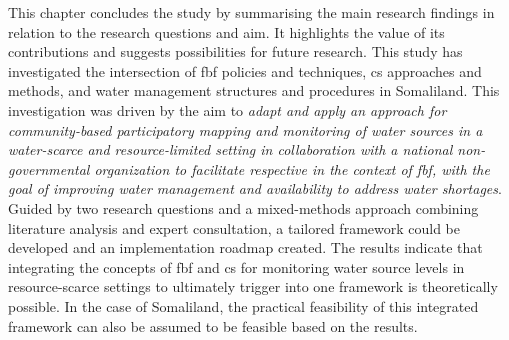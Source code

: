 This chapter concludes the study by summarising the main research findings in relation to the research questions and aim. It highlights the value of its contributions and suggests possibilities for future research.\newline
This study has investigated the intersection of \acrlong{fbf} policies and techniques, \acrlong{cs} approaches and methods, and water management structures and procedures in Somaliland. This investigation was driven by the aim to \textit{adapt and apply an approach for community-based participatory mapping and monitoring of water sources in a water-scarce and resource-limited setting in collaboration with a national non-governmental organization to facilitate respective  in the context of \acrlong{fbf}, with the goal of improving water management and availability to address water shortages}.\newline
Guided by two research questions and a mixed-methods approach combining literature analysis and expert consultation, a tailored framework could be developed and an implementation roadmap created. The results indicate that integrating the concepts of \acrlong{fbf} and \acrlong{cs} for monitoring water source levels in resource-scarce settings to ultimately trigger  into one framework is theoretically possible. In the case of Somaliland, the practical feasibility of this integrated framework can also be assumed to be feasible based on the results.\newline %
